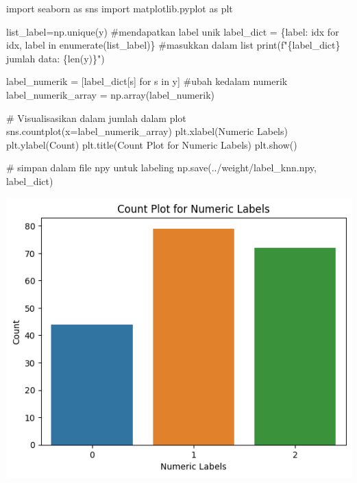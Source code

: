 \documentclass[
  letterpaper,
  DIV=11,
  numbers=noendperiod]{scrreprt}
\newenvironment{Shaded}{\begin{snugshade}}{\end{snugshade}}
\newcommand{\BuiltInTok}[1]{\textcolor[rgb]{0.00,0.23,0.31}{#1}}
\newcommand{\CommentTok}[1]{\textcolor[rgb]{0.37,0.37,0.37}{#1}}
\newcommand{\ControlFlowTok}[1]{\textcolor[rgb]{0.00,0.23,0.31}{#1}}
\newcommand{\ImportTok}[1]{\textcolor[rgb]{0.00,0.46,0.62}{#1}}
\newcommand{\KeywordTok}[1]{\textcolor[rgb]{0.00,0.23,0.31}{#1}}
\newcommand{\NormalTok}[1]{\textcolor[rgb]{0.00,0.23,0.31}{#1}}
\newcommand{\OperatorTok}[1]{\textcolor[rgb]{0.37,0.37,0.37}{#1}}
\newcommand{\SpecialCharTok}[1]{\textcolor[rgb]{0.37,0.37,0.37}{#1}}
\newcommand{\SpecialStringTok}[1]{\textcolor[rgb]{0.13,0.47,0.30}{#1}}
\newcommand{\StringTok}[1]{\textcolor[rgb]{0.13,0.47,0.30}{#1}}
\begin{document}
\begin{Shaded}
\begin{Highlighting}[]
\ImportTok{import}\NormalTok{ seaborn }\ImportTok{as}\NormalTok{ sns}
\ImportTok{import}\NormalTok{ matplotlib.pyplot }\ImportTok{as}\NormalTok{ plt}

\NormalTok{list\_label}\OperatorTok{=}\NormalTok{np.unique(y) }\CommentTok{\#mendapatkan label unik}
\NormalTok{label\_dict }\OperatorTok{=}\NormalTok{ \{label: idx }\ControlFlowTok{for}\NormalTok{ idx, label }\KeywordTok{in} \BuiltInTok{enumerate}\NormalTok{(list\_label)\} }\CommentTok{\#masukkan dalam list}
\BuiltInTok{print}\NormalTok{(}\SpecialStringTok{f"}\SpecialCharTok{\{}\NormalTok{label\_dict}\SpecialCharTok{\}}\SpecialStringTok{ jumlah data: }\SpecialCharTok{\{}\BuiltInTok{len}\NormalTok{(y)}\SpecialCharTok{\}}\SpecialStringTok{"}\NormalTok{)}

\NormalTok{label\_numerik }\OperatorTok{=}\NormalTok{ [label\_dict[s] }\ControlFlowTok{for}\NormalTok{ s }\KeywordTok{in}\NormalTok{ y] }\CommentTok{\#ubah kedalam numerik}
\NormalTok{label\_numerik\_array }\OperatorTok{=}\NormalTok{ np.array(label\_numerik)}

\CommentTok{\# Visualisasikan dalam jumlah dalam plot}
\NormalTok{sns.countplot(x}\OperatorTok{=}\NormalTok{label\_numerik\_array)}
\NormalTok{plt.xlabel(}\StringTok{\textquotesingle{}Numeric Labels\textquotesingle{}}\NormalTok{)}
\NormalTok{plt.ylabel(}\StringTok{\textquotesingle{}Count\textquotesingle{}}\NormalTok{)}
\NormalTok{plt.title(}\StringTok{\textquotesingle{}Count Plot for Numeric Labels\textquotesingle{}}\NormalTok{)}
\NormalTok{plt.show()  }

\CommentTok{\# simpan dalam file npy untuk labeling}
\NormalTok{np.save(}\StringTok{\textquotesingle{}../weight/label\_knn.npy\textquotesingle{}}\NormalTok{, label\_dict)  }
\end{Highlighting}
\end{Shaded}

\includegraphics{Asset/plot_siftbovw.png}
\end{document}
